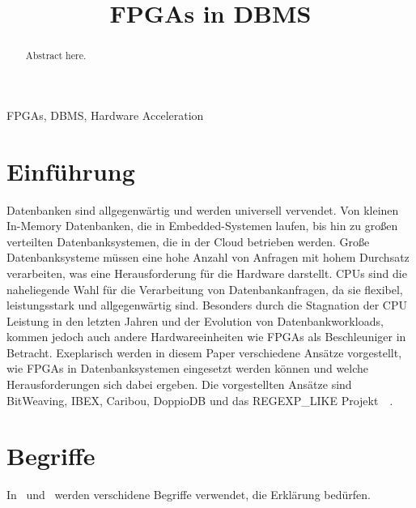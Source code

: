 \documentclass[conference]{IEEEtran}
\begin{document}

\title{FPGAs in DBMS
}

\author{
}

\maketitle

\begin{abstract}
    Abstract here.
\end{abstract}

\begin{IEEEkeywords}
    FPGAs, DBMS, Hardware Acceleration
\end{IEEEkeywords}

\section{Einführung}
Datenbanken sind allgegenwärtig und werden universell vervendet. Von kleinen In-Memory Datenbanken, die in Embedded-Systemen laufen, bis
hin zu großen verteilten Datenbanksystemen, die in der Cloud betrieben werden. Große Datenbanksysteme müssen eine hohe Anzahl von Anfragen
mit hohem Durchsatz verarbeiten, was eine Herausforderung für die Hardware darstellt. CPUs sind die naheliegende Wahl für die Verarbeitung
von Datenbankanfragen, da sie flexibel, leistungsstark und allgegenwärtig sind. Besonders durch die Stagnation der CPU Leistung in den letzten Jahren
und der Evolution von Datenbankworkloads, kommen jedoch auch andere Hardwareeinheiten wie FPGAs als Beschleuniger in Betracht. Exeplarisch
werden in diesem Paper verschiedene Ansätze vorgestellt, wie FPGAs in Datenbanksystemen eingesetzt werden können und welche Herausforderungen
sich dabei ergeben. Die vorgestellten Ansätze sind BitWeaving, IBEX, Caribou, DoppioDB und das REGEXP\_LIKE Projekt~\cite{lisa_column_2018}~\cite{istvan_glass_2019}.


\section{Begriffe}
In~\cite{li_bitweaving_2013} und~\cite{lisa_column_2018} werden verschidene Begriffe verwendet, die Erklärung bedürfen.
\end{document}
